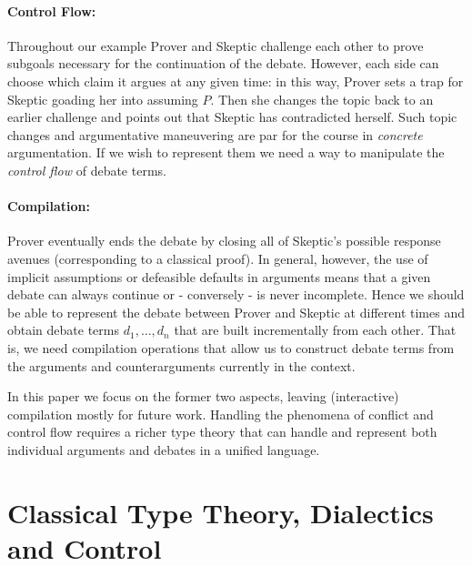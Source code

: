 \documentclass{IOS-Book-Article}
\begin{document}
  \paragraph{Control Flow:} Throughout our example Prover and Skeptic challenge each other to prove subgoals necessary for the continuation of the debate. However, each side can choose which claim it argues at any given time: in this way, Prover sets a trap for Skeptic goading her into assuming $P$. Then she changes the topic back to an earlier challenge and points out that Skeptic has contradicted herself. Such topic changes and argumentative maneuvering are par for the course in \emph{concrete} argumentation. If we wish to represent them we need a way to manipulate the \emph{control flow} of debate terms.
  \paragraph{Compilation:} Prover eventually ends the debate by closing all of Skeptic's possible response avenues (corresponding to a classical proof). In general, however, the use of implicit assumptions or defeasible defaults in arguments means that a given debate can always continue or - conversely - is never incomplete. Hence we should be able to represent the debate between Prover and Skeptic at different times and obtain debate terms $d_1, \dots, d_n$ that are built incrementally from each other. That is, we need compilation operations that allow us to construct debate terms from the arguments and counterarguments currently in the context.

    In this paper we focus on the former two aspects, leaving (interactive) compilation mostly for future work.
  Handling the phenomena of conflict and control flow requires a richer type theory that can handle and represent both individual arguments and debates in a unified language.
 
\section{Classical Type Theory, Dialectics and Control}\label{sec:class-type-theory}
\end{document}
